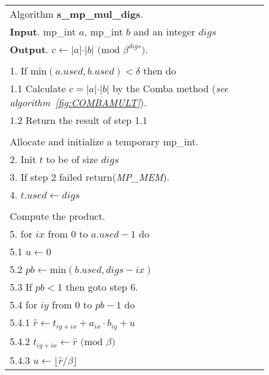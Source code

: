 \documentclass[b5paper]{book}
\begin{document}
\newpage\begin{figure}[!here]
\begin{small}
\begin{center}
\begin{tabular}{l}
\hline Algorithm \textbf{s\_mp\_mul\_digs}. \\
\textbf{Input}.   mp\_int $a$, mp\_int $b$ and an integer $digs$ \\
\textbf{Output}.  $c \leftarrow \vert a \vert \cdot \vert b \vert \mbox{ (mod }\beta^{digs}\mbox{)}$. \\
\hline \\
1.  If min$(a.used, b.used) < \delta$ then do \\
\hspace{3mm}1.1  Calculate $c = \vert a \vert \cdot \vert b \vert$ by the Comba method (\textit{see algorithm~\ref{fig:COMBAMULT}}).  \\
\hspace{3mm}1.2  Return the result of step 1.1 \\
\\
Allocate and initialize a temporary mp\_int. \\
2.  Init $t$ to be of size $digs$ \\
3.  If step 2 failed return(\textit{MP\_MEM}). \\
4.  $t.used \leftarrow digs$ \\
\\
Compute the product. \\
5.  for $ix$ from $0$ to $a.used - 1$ do \\
\hspace{3mm}5.1  $u \leftarrow 0$ \\
\hspace{3mm}5.2  $pb \leftarrow \mbox{min}(b.used, digs - ix)$ \\
\hspace{3mm}5.3  If $pb < 1$ then goto step 6. \\
\hspace{3mm}5.4  for $iy$ from $0$ to $pb - 1$ do \\
\hspace{6mm}5.4.1  $\hat r \leftarrow t_{iy + ix} + a_{ix} \cdot b_{iy} + u$ \\
\hspace{6mm}5.4.2  $t_{iy + ix} \leftarrow \hat r \mbox{ (mod }\beta\mbox{)}$ \\
\hspace{6mm}5.4.3  $u \leftarrow \lfloor \hat r / \beta \rfloor$ \\

\end{tabular}
\end{center}
\end{small}
\end{figure}
\end{document}
